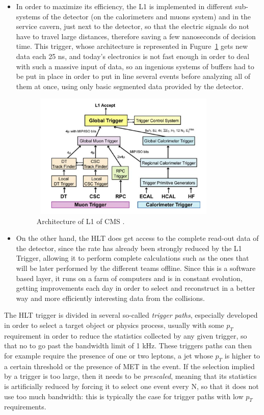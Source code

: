 \documentclass[a4paper, 10pt, openright]{report}
\begin{document}
\begin{itemize}
\item In order to maximize its efficiency, the \acf{L1} is implemented in different sub-systems of the detector (on the calorimeters and muons system) and in the service cavern, just next to the detector, so that the electric signals do not have to travel large distances, therefore saving a few nanoseconds of decision time. This trigger, whose architecture is represented in Fugure~\ref{fig:L1Trigg} gets new data each 25 ns, and today's electronics is not fast enough in order to deal with such a massive input of data, so an ingenious systems of buffers had to be put in place in order to put in line several events before analyzing all of them at once, using only basic segmented data provided by the detector.

\begin{figure}[htbp]
\begin{center}
\includegraphics[width=9cm, height=6cm]{figs/L1Trigg.png}
\caption{Architecture of \acf{L1} of \ac{CMS} \cite{CMSDescription}.}
\label{fig:L1Trigg}
\end{center}
\end{figure}

\item On the other hand, the \acf{HLT} does get access to the complete read-out data of the detector, since the rate has already been strongly reduced by the \ac{L1} Trigger, allowing it to perform complete calculations such as the ones that will be later performed by the different teams offline. Since this is a software based layer, it runs on a farm of computers and is in constant evolution, getting improvements each day in order to select and reconstruct in a better way and more efficiently interesting data from the collisions.
\end{itemize}

The \ac{HLT} trigger is divided in several so-called \textit{trigger paths}, especially developed in order to select a target object or physics process, usually with some $p_T$ requirement in order to reduce the statistics collected by any given trigger, so that no to go past the bandwidth limit of 1 kHz. These triggers paths can then for example require the presence of one or two leptons, a jet whose $p_T$ is higher to a certain threshold or the presence of \acf{MET} in the event. If the selection implied by a trigger is too large, then it needs to be \textit{prescaled}, meaning that its statistics is artificially reduced by forcing it to select one event every N, so that it does not use too much bandwidth: this is typically the case for trigger paths with low $p_T$ requirements.
\end{document}
